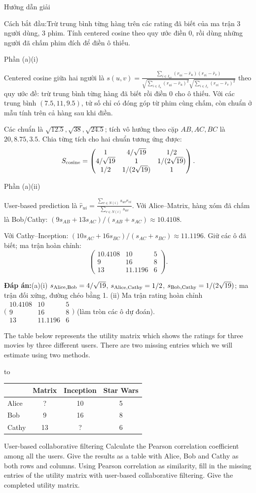 \documentclass[10pt,a4paper,twocolumn]{article}
\makeatletter
\newcommand{\maptag}[1]{\phantomsection\@bsphack\protected@write\@auxout{}{\string\newlabel{#1}{{}{\thepage}{}{\@currentHref}{}}}\@esphack}
\newcommand{\key}[1]{#1:\enspace}
\newcommand{\solutionprompt}[1]{\par\addvspace{1pt}\noindent\key{Cách bắt đầu}#1\par\addvspace{2pt}}
\newcommand{\blocklabel}[1]{\par\noindent#1\par\nobreak}
\newcommand{\answer}[1]{%
  \par\addvspace{3pt}%
  \blocklabel{#1Hướng dẫn giải}}
\newcommand{\finalanswer}[1]{%
  \par\addvspace{3pt}\noindent\textbf{Đáp án:}\nobreak\enspace#1\par}
\newcommand{\guidepart}[1]{%
  \par\addvspace{1.5pt}%
  \blocklabel{Phần #1}}
\newenvironment{examtable}[1]{%
  \par\addvspace{2pt}\noindent\hbox to \linewidth\bgroup\hfil
  \setlength{\tabcolsep}{4pt}%
  \renewcommand{\arraystretch}{1.12}\begin{tabular}{#1}%
}{\end{tabular}\hfil\egroup\par\addvspace{2pt}}
\newcommand{\qrating}{%
  \begin{examtable}{@{}lccc@{}}
  \toprule
  & Matrix & Inception & Star Wars\\
  \midrule
  Alice & ? & 10 & 5\\
  Bob & 9 & 16 & 8\\
  Cathy & 13 & ? & 6\\
  \bottomrule
  \end{examtable}}
\makeatother
\begin{document}
\answer{\maptag{answer:A2-Q1}\maptag{answer:A2-Q1a}}
\solutionprompt{Trừ trung bình từng hàng trên các rating đã biết của ma trận 3 người dùng, 3 phim. Tính centered cosine theo quy ước điền 0, rồi dùng những người đã chấm phim đích để điền ô thiếu.}
\guidepart{(a)(i)}
\begin{guidesteps}[beginpenalty=10000]
\item Centered cosine giữa hai người là $s(u,v)=\frac{\sum_{i\in I_{uv}}(r_{ui}-\bar r_u)(r_{vi}-\bar r_v)}{\sqrt{\sum_{i\in I_u}(r_{ui}-\bar r_u)^2}\sqrt{\sum_{i\in I_v}(r_{vi}-\bar r_v)^2}}$ theo quy ước đề: trừ trung bình từng hàng đã biết rồi điền 0 cho ô thiếu. Với các trung bình $(7.5,11,9.5)$, tử số chỉ có đóng góp từ phim cùng chấm, còn chuẩn ở mẫu tính trên cả hàng sau khi điền.
\item Các chuẩn là $\sqrt{12.5},\sqrt{38},\sqrt{24.5}$; tích vô hướng theo cặp $AB,AC,BC$ là $20,8.75,3.5$. Chia từng tích cho hai chuẩn tương ứng được:
\[
S_{\rm cosine}=\begin{pmatrix}
1&4/\sqrt{19}&1/2\\
4/\sqrt{19}&1&1/(2\sqrt{19})\\
1/2&1/(2\sqrt{19})&1
\end{pmatrix}.
\]
\end{guidesteps}
\guidepart{(a)(ii)}
\begin{guidesteps}
\item User-based prediction là $\hat r_{ui}=\frac{\sum_{v\in N(i)}s_{uv}r_{vi}}{\sum_{v\in N(i)}s_{uv}}$. Với Alice--Matrix, hàng xóm đã chấm là Bob/Cathy: $(9s_{AB}+13s_{AC})/(s_{AB}+s_{AC})\approx10.4108$.
\item Với Cathy--Inception: $(10s_{AC}+16s_{BC})/(s_{AC}+s_{BC})\approx11.1196$. Giữ các ô đã biết; ma trận hoàn chỉnh:
\[
\begin{pmatrix}10.4108&10&5\\9&16&8\\13&11.1196&6\end{pmatrix}.
\]
\end{guidesteps}
\finalanswer{(a)(i) $s_{\rm Alice,Bob}=4/\sqrt{19}$, $s_{\rm Alice,Cathy}=1/2$, $s_{\rm Bob,Cathy}=1/(2\sqrt{19})$; ma trận đối xứng, đường chéo bằng 1. (ii) Ma trận rating hoàn chỉnh $\bigl(\begin{smallmatrix}10.4108&10&5\\9&16&8\\13&11.1196&6\end{smallmatrix}\bigr)$ (làm tròn các ô dự đoán).}

The table below represents the utility matrix which shows the ratings for three movies by three different users. There are two missing entries which we will estimate using two methods.
\qrating
{} User-based collaborative filtering
 Calculate the Pearson correlation coefficient among all the users. Give the results as a table with Alice, Bob and Cathy as both rows and columns.
 Using Pearson correlation as similarity, fill in the missing entries of the utility matrix with user-based collaborative filtering. Give the completed utility matrix.
\end{document}
